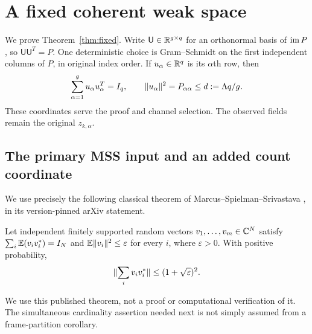 \section{A fixed coherent weak space}\label{sec:fixed}
We prove Theorem~\ref{thm:fixed}. Write $\mathsf U\in\mathbb R^{g\times q}$ for an
orthonormal basis of $\operatorname{im} P$, so $\mathsf U\mathsf U^T=P$. One deterministic
choice is Gram--Schmidt on the first independent columns of $P$, in original
index order. If $u_\alpha\in\mathbb R^q$ is its $\alpha$th row, then
\begin{equation}\label{eq:frame}
 \sum_{\alpha=1}^g u_\alpha u_\alpha^T=I_q,\qquad
 \lVert u_\alpha\rVert^2=P_{\alpha\alpha}\leq d:=\Lambda q/g.
\end{equation}
These coordinates serve the proof and channel selection. The observed fields
remain the original $z_{k,\alpha}$.

\subsection{The primary MSS input and an added count coordinate}
We use precisely the following classical theorem of
Marcus--Spielman--Srivastava \cite[Theorem 1.4, p.~3]{MSS}, in its version-pinned
arXiv statement.
\begin{theorem}\label{thm:MSS}
Let independent finitely supported random vectors $v_1,\ldots,v_m\in\mathbb C^N$
satisfy $\sum_i\mathbb E(v_iv_i^*)=I_N$ and
$\mathbb E\lVert v_i\rVert^2\leq\varepsilon$ for every $i$, where $\varepsilon>0$.
With positive probability,
\[
 \lVert \sum_i v_iv_i^*\rVert\leq(1+\sqrt\varepsilon)^2.
\]
\end{theorem}
We use this published theorem, not a proof or computational verification of it.
The simultaneous cardinality assertion needed next is not simply assumed
from a frame-partition corollary.

